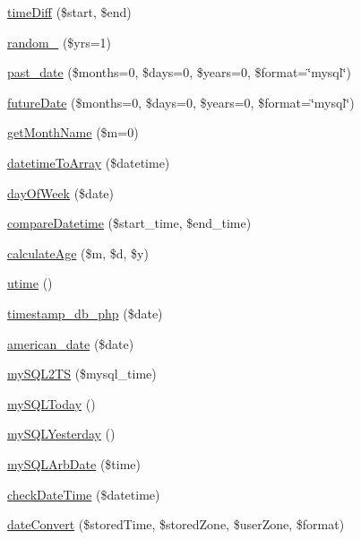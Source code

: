 \begin{DoxyCompactItemize}
\item 
\hyperlink{class_date_a19108d0904905651f7c404c9a98bc150}{time\-Diff} (\$start, \$end)
\item 
\hyperlink{class_date_a496c5b23f40786ccfc50f70ffa944234}{random\-\_} (\$yrs=1)
\item 
\hyperlink{class_date_a2dcbf4c60b7c86136ccf64e6ee3f9dc9}{past\-\_\-date} (\$months=0, \$days=0, \$years=0, \$format=\char`\"{}mysql\char`\"{})
\item 
\hyperlink{class_date_a125ffecf0f3e4993016b03d9d75548a2}{future\-Date} (\$months=0, \$days=0, \$years=0, \$format=\char`\"{}mysql\char`\"{})
\item 
\hyperlink{class_date_a5afd879f45a4aa92dd585b8dc176a1d5}{get\-Month\-Name} (\$m=0)
\item 
\hyperlink{class_date_aa358fa2b8b34605bddd7e198ad05a796}{datetime\-To\-Array} (\$datetime)
\item 
\hyperlink{class_date_af4c99c0ff6895df320358eff4fb99d74}{day\-Of\-Week} (\$date)
\item 
\hyperlink{class_date_adffa6f1d46375df77dcc2bfa37eaf034}{compare\-Datetime} (\$start\-\_\-time, \$end\-\_\-time)
\item 
\hyperlink{class_date_a122e7b8379c9c1f571dcd473e4422ceb}{calculate\-Age} (\$m, \$d, \$y)
\item 
\hyperlink{class_date_abfc36009d8e19d17dc37a8e54c637ed3}{utime} ()
\item 
\hyperlink{class_date_a6a378849f2c9faca646d85c6dfe45cc0}{timestamp\-\_\-db\-\_\-php} (\$date)
\item 
\hyperlink{class_date_aee6194d7e8b022d9dc23420739ab350e}{american\-\_\-date} (\$date)
\item 
\hyperlink{class_date_a5a837d39143a9dad5231b184b858396e}{my\-S\-Q\-L2\-T\-S} (\$mysql\-\_\-time)
\item 
\hyperlink{class_date_a80429a244aa6fc88d8af9f39e8645d9d}{my\-S\-Q\-L\-Today} ()
\item 
\hyperlink{class_date_af1ae982aeddc797eaa1bbbfd5f9edd70}{my\-S\-Q\-L\-Yesterday} ()
\item 
\hyperlink{class_date_a2eae88c0eec770a6b005a4dccd7939da}{my\-S\-Q\-L\-Arb\-Date} (\$time)
\item 
\hyperlink{class_date_a1edf24a9e60860f16a45bcd9704b6fbc}{check\-Date\-Time} (\$datetime)
\item 
\hyperlink{class_date_ac6859026dccb5a55c1238a4fd8d54201}{date\-Convert} (\$stored\-Time, \$stored\-Zone, \$user\-Zone, \$format)
\end{DoxyCompactItemize}
